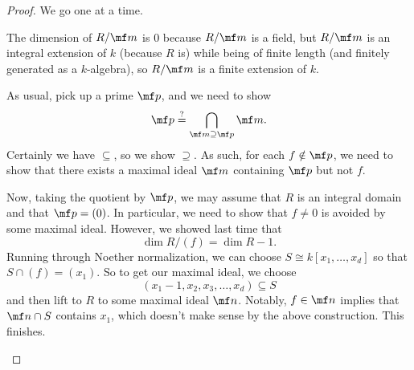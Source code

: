 \documentclass[../notes.tex]{subfiles}
\begin{document}
\begin{proof}
	We go one at a time.
	\begin{listalph}
		\item The dimension of $R/\mf m$ is $0$ because $R/\mf m$ is a field, but $R/\mf m$ is an integral extension of $k$ (because $R$ is) while being of finite length (and finitely generated as a $k$-algebra), so $R/\mf m$ is a finite extension of $k$.
		\item As usual, pick up a prime $\mf p$, and we need to show
		\[\mf p\stackrel?=\bigcap_{\mf m\supseteq\mf p}\mf m.\]
		Certainly we have $\subseteq$, so we show $\supseteq$. As such, for each $f\notin\mf p$, we need to show that there exists a maximal ideal $\mf m$ containing $\mf p$ but not $f$.

		Now, taking the quotient by $\mf p$, we may assume that $R$ is an integral domain and that $\mf p=(0)$. In particular, we need to show that $f\ne0$ is avoided by some maximal ideal. However, we showed last time that
		\[\dim R/(f)=\dim R-1.\]
		Running through Noether normalization, we can choose $S\cong k[x_1,\ldots,x_d]$ so that $S\cap(f)=(x_1)$. So to get our maximal ideal, we choose
		\[(x_1-1,x_2,x_3,\ldots,x_d)\subseteq S\]
		and then lift to $R$ to some maximal ideal $\mf n$. Notably, $f\in\mf n$ implies that $\mf n\cap S$ contains $x_1$, which doesn't make sense by the above construction. This finishes.
		\qedhere
	\end{listalph}
\end{proof}
\end{document}
